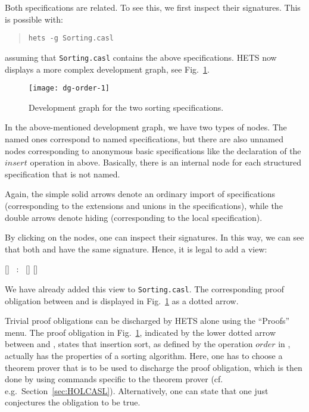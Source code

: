 \documentclass{article}
\newcommand{\normalTEXTSC}[2]{{#1\scriptsize#2}}
\newcommand     {\Hets}{\normalTEXTSC{H}{ETS}\xspace}
\begin{document}
Both specifications are related. To see this, we first inspect
their signatures. This is possible with:
\begin{quote}
\texttt{hets -g Sorting.casl}
\end{quote}
assuming that \texttt{Sorting.casl} contains the above specifications.
\Hets now displays a more complex development graph, see Fig.~\ref{fig:dg1}.


\begin{figure}
\begin{center}
\texttt{[image: dg-order-1]}
\end{center}
\caption{Development graph for the two sorting specifications.\label{fig:dg1}}
\end{figure}


In the above-mentioned development graph, we have two types of nodes.
The named ones correspond to named specifications, but there
are also unnamed nodes corresponding to anonymous basic
specifications like the declaration of the $insert$ operation in 
 above. Basically, there is an
internal node for each structured specification that is not named.

Again, the simple solid arrows denote an ordinary import of specifications
(corresponding to the extensions and unions in the
specifications), while the double arrows denote hiding (corresponding to 
the local specification).

By clicking on the nodes, one can inspect their signatures.
In this way, we can see that both    and
 have the same signature. Hence, it
is legal to add a view:

\begin{EXAMPLE}%
\I\VIEW {}[] ~:~ []  \TO 
{}[]
\I\END
\end{EXAMPLE}

We have already added this view to \texttt{Sorting.casl}.
The corresponding 
proof obligation between   and 
 is displayed in Fig.~\ref{fig:dg1}
 as a dotted arrow.


Trivial proof obligations can be discharged 
by \Hets alone using the ``Proofs'' menu.
The proof obligation in Fig.~\ref{fig:dg1},
indicated by the lower dotted
arrow between   and 
, states that insertion sort,
as defined by the operation \(order\) in ,
actually has the properties of a sorting algorithm.  Here, one has to
choose a theorem prover that 
is to be used to discharge the proof
obligation, which is then done by using commands specific to the
theorem prover (cf. e.g.\ Section~\ref{sec:HOLCASL}).  Alternatively,
one can state that one just conjectures the obligation to be true.
\end{document}
